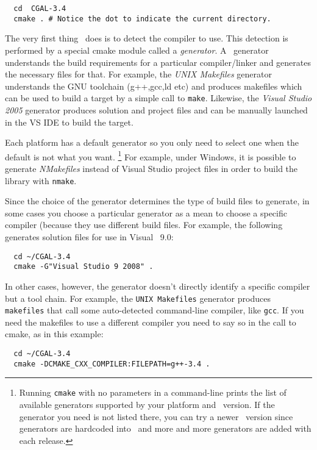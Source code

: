 {\ccTexHtml{\scriptsize}{}
\begin{verbatim}
  cd  CGAL-3.4
  cmake . # Notice the dot to indicate the current directory.
\end{verbatim}
}


The very first thing \cmake\ does is to detect the compiler to use.
This detection is performed by a special cmake module called a {\em generator}. A
\cmake\ generator understands the build requirements for a particular compiler/linker
 and generates the necessary files for that. For example, the 
{\em UNIX Makefiles} generator understands the GNU toolchain (g++,gcc,ld etc) and produces makefiles
which can be used to build a target by a simple call to \texttt{make}.
Likewise, the {\em Visual Studio 2005} generator produces solution and project files and can be manually
launched in the VS IDE to build the target.

Each platform has a default generator so you only need to select one when the default is
not what you want. 
\footnote{Running \texttt{cmake} with no parameters in a command-line prints the list of available generators supported 
by your platform and \cmake\ version. If the generator you need is not listed there, you can
try a newer \cmake\ version since generators are hardcoded into \cmake\ and more and
more generators are added with each release.}
For example, under Windows, it is possible to generate {\em NMakefiles}
instead of Visual Studio project files in order to build the library with \texttt{nmake}.

Since the choice of the generator determines the type of build files to generate, in some cases
you choose a particular generator as a mean to choose a specific compiler (because they use different 
build files. For example, the following generates solution files for use in Visual \CC\ 9.0:

{\ccTexHtml{\scriptsize}{}
\begin{verbatim}
  cd ~/CGAL-3.4
  cmake -G"Visual Studio 9 2008" . 
\end{verbatim}
}

In other cases, however, the generator doesn't directly identify a specific compiler but a tool chain.
For example, the \texttt{UNIX Makefiles} generator produces \texttt{makefiles} that call some auto-detected
command-line compiler, like \texttt{gcc}. If you need the makefiles to use a different compiler you need to
say so in the call to cmake, as in this example:

{\ccTexHtml{\scriptsize}{}
\begin{verbatim}
  cd ~/CGAL-3.4
  cmake -DCMAKE_CXX_COMPILER:FILEPATH=g++-3.4 . 
\end{verbatim}
}


